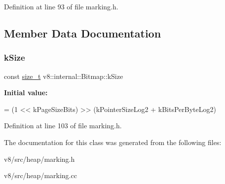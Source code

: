 Definition at line 93 of file marking.\+h.



\subsection{Member Data Documentation}
\mbox{\label{classv8_1_1internal_1_1Bitmap_aace66f0559638e54076e0d27b8d9ecc3}} 
\subsubsection{\texorpdfstring{k\+Size}{kSize}}
{\footnotesize\ttfamily const \mbox{\hyperlink{classsize__t}{size\+\_\+t}} v8\+::internal\+::\+Bitmap\+::k\+Size\hspace{0.3cm}{\ttfamily [static]}}

{\bfseries Initial value\+:}
\begin{DoxyCode}
= (1 << kPageSizeBits) >>
                              (kPointerSizeLog2 + kBitsPerByteLog2)
\end{DoxyCode}


Definition at line 103 of file marking.\+h.



The documentation for this class was generated from the following files\+:\begin{DoxyCompactItemize}
\item 
v8/src/heap/marking.\+h\item 
v8/src/heap/marking.\+cc\end{DoxyCompactItemize}

